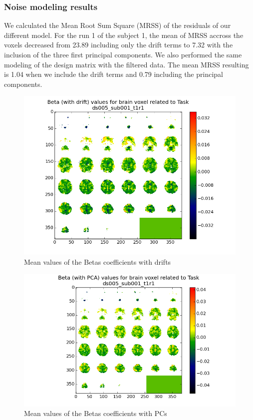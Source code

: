 \subsubsection{Noise modeling results}
\noindent
\par We calculated the Mean Root Sum Square (MRSS) of the residuals of our different model.
For the run 1 of the subject 1, the mean of MRSS accross the voxels decreased from 23.89 
including only the drift terms to 7.32 with the inclusion of the three first principal 
components. We also performed the same modeling of the design matrix with the filtered data.
The mean MRSS resulting is 1.04 when we include the drift terms and 0.79 including the 
principal components.

\begin{figure}[H]
  \centering
  \includegraphics[scale=0.75]{../fig/mosaic/ds005_sub001_t1r1_withdrift_Task.png}
  \caption{Mean values of the Betas coefficients with drifts}
  \label{fig:betas1}
\end{figure}

\begin{figure}[H]
  \centering
  \includegraphics[scale=0.85]{../fig/mosaic/ds005_sub001_t1r1_withPCA_Task.png}
  \caption{Mean values of the Betas coefficients with PCs}
  \label{fig:betas2}
\end{figure}

